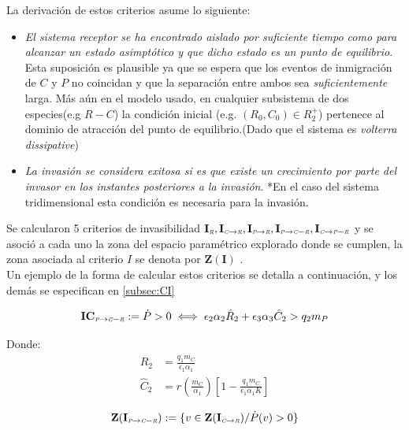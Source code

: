 La derivaci\'on de estos criterios asume lo siguiente:
\begin{itemize}
\item \emph{El sistema receptor se ha encontrado aislado por suficiente tiempo como para alcanzar un estado asimpt\'otico y que dicho estado es un punto de equilibrio}.\\Esta suposici\'on es plausible ya que se espera que los eventos de inmigraci\'on de $C$ y $P$ no coincidan y que la separaci\'on entre ambos sea \emph{suficientemente} larga. M\'as a\'un en el modelo usado, en cualquier subsistema de dos especies(e.g $R-C$) la condición inicial (e.g. $(R_0,C_0) \in R_2^+$) pertenece al dominio de atracci\'on del punto de equilibrio.(Dado que el sistema es \emph{volterra dissipative})
\item \emph{La invasi\'on se considera exitosa si es que existe un crecimiento por parte del invasor en los instantes posteriores a la invasi\'on}. *En el caso del sistema tridimensional esta condición es necesaria para la invasión.
\end{itemize}

Se calcularon 5 criterios de invasibilidad $\mathbf{I_{\textit{\tiny R}},I_{\textit{\tiny C} \to \textit{\tiny R}},I_{\textit{\tiny P} \to \textit{\tiny R}},I_{\textit{\tiny P} \to \textit{\tiny C}-\textit{\tiny R}},I_{\textit{\tiny C} \to \textit{\tiny P}-\textit{\tiny R}}}$ y se asoci\'o a cada uno la zona del espacio param\'etrico explorado donde se cumplen, la zona asociada al criterio $I$ se denota por $\mathbf{Z(I)}$ .\\

Un ejemplo de la forma de calcular estos criterios se detalla a continuaci\'on, y los dem\'as se especifican en \ref{subsec:CI}


\begin{equation} \mathbf{IC_{\textit{\tiny P} \to \textit{\tiny C}-\textit{\tiny R}}} := \dot{P} >0 \iff \epsilon_2\alpha_2\hat{R}_2 + \epsilon_3\alpha_3\hat{C}_2 > q_2 m_P \end{equation}

Donde:
\begin{equation}
\begin{aligned}
\hat{R}_2 &= \frac{q_1 m_C}{\epsilon_1 \alpha_1} \\
\hat{C}_2 &=  r(\frac{m_C}{\alpha_1}) \left[ 1 - \frac{q_1 m_C}{\epsilon_1 \alpha_1 K} \right] 
\end{aligned}
\end{equation}

\begin{equation}
\mathbf{Z(I_{\textit{\tiny P} \to \textit{\tiny C}-\textit{\tiny R}})} := \{ v \in \mathbf{Z(I_{\textit{\tiny C} \to \textit{\tiny R}})} / \dot{P}(v) > 0 \}
\end{equation}


